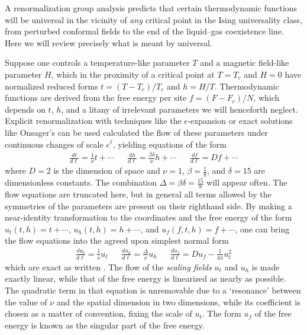 \documentclass[
aps,
pre,
preprint,
longbibliography,
floatfix
]{revtex4-2}
\begin{document}
A renormalization group analysis predicts that certain thermodynamic functions
will be universal in the vicinity of \emph{any} critical point in the Ising
universality class, from perturbed conformal fields to the end of the
liquid--gas coexistence line. Here we will review precisely what is meant by
universal.

Suppose one controls a temperature-like parameter $T$ and a magnetic field-like
parameter $H$, which in the proximity of a critical point at $T=T_c$ and $H=0$
have normalized reduced forms $t=(T-T_c)/T_c$ and $h=H/T$. Thermodynamic
functions are derived from the free energy per site $f=(F-F_c)/N$, which
depends on $t$, $h$, and a litany of irrelevant parameters we will henceforth
neglect.  Explicit renormalization with techniques like the
$\epsilon$-expansion or exact solutions like Onsager's can be used calculated
the flow of these parameters under continuous changes of scale $e^\ell$,
yielding equations of the form
\begin{align} \label{eq:raw.flow}
  \frac{dt}{d\ell}=\frac1\nu t+\cdots
  &&
  \frac{dh}{d\ell}=\frac{\beta\delta}\nu h+\cdots
  &&
  \frac{df}{d\ell}=Df+\cdots
\end{align}
where $D=2$ is the dimension of space and $\nu=1$, $\beta=\frac18$, and
$\delta=15$ are dimensionless constants. The combination
$\Delta=\beta\delta=\frac{15}8$ will appear often. The flow equations are
truncated here, but in general all terms allowed by the symmetries of the
parameters are present on their righthand side. By making a near-identity
transformation to the coordinates and the free energy of the form $u_t(t,
h)=t+\cdots$, $u_h(t, h)=h+\cdots$, and $u_f(f,t,h)=f+\cdots$, one can bring
the flow equations into the agreed upon simplest normal form
\begin{align} \label{eq:flow}
  \frac{du_t}{d\ell}=\frac1\nu u_t
  &&
  \frac{du_h}{d\ell}=\frac{\Delta}\nu u_h
  &&
  \frac{du_f}{d\ell}=Du_f-\frac1{4\pi}u_t^2
\end{align}
which are exact as written \cite{Raju_2019_Normal}. The flow of the
\emph{scaling fields} $u_t$ and $u_h$ is made exactly linear, while that of the
free energy is linearized as nearly as possible. The quadratic term in that
equation is unremovable due to a `resonance' between the value of $\nu$ and the
spatial dimension in two dimensions, while its coefficient is chosen as a
matter of convention, fixing the scale of $u_t$. The form $u_f$ of the free
energy is known as the singular part of the free energy.
\end{document}
